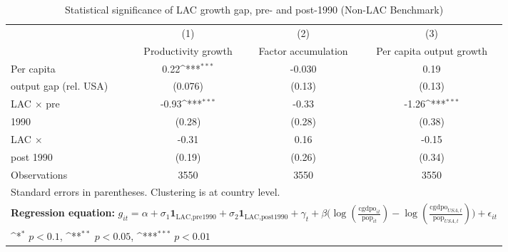 \begin{table}[htbp]\centering
\def\sym#1{\ifmmode^{#1}\else\(^{#1}\)\fi}
\caption{Statistical significance of LAC growth gap, pre- and post-1990 (Non-LAC Benchmark)}
\begin{tabular}{l*{3}{c}}
\toprule
                &\multicolumn{1}{c}{(1)}&\multicolumn{1}{c}{(2)}&\multicolumn{1}{c}{(3)}\\
                &\multicolumn{1}{c}{Productivity growth}&\multicolumn{1}{c}{Factor accumulation}&\multicolumn{1}{c}{Per capita output growth}\\
\midrule
Per capita      &     0.22\sym{***}&   -0.030         &     0.19         \\
output gap (rel. USA)&  (0.076)         &   (0.13)         &   (0.13)         \\
\addlinespace
LAC $\times$ pre&    -0.93\sym{***}&    -0.33         &    -1.26\sym{***}\\
1990            &   (0.28)         &   (0.28)         &   (0.38)         \\
\addlinespace
LAC $\times$    &    -0.31         &     0.16         &    -0.15         \\
post 1990       &   (0.19)         &   (0.26)         &   (0.34)         \\
\midrule
Observations    &     3550         &     3550         &     3550         \\
\bottomrule
\multicolumn{4}{l}{\footnotesize Standard errors in parentheses. Clustering is at country level.}\\
\multicolumn{4}{l}{\footnotesize \textbf{Regression equation:} \(g_{it} = \alpha + \sigma_1 \mathbf{1}_{\textrm{LAC,pre1990}} + \sigma_2 \mathbf{1}_{\textrm{LAC,post1990}} + \gamma_t + \beta \big(\log (\frac{\textrm{cgdpo}_{it}}{\textrm{pop}_{it}} ) - \log (\frac{\textrm{cgdpo}_{USA,t}}{\textrm{pop}_{USA,t}}  ) \big) + \epsilon_{it}\)}\\
\multicolumn{4}{l}{\footnotesize \sym{*} \(p<0.1\), \sym{**} \(p<0.05\), \sym{***} \(p<0.01\)}\\
\end{tabular}
\end{table}
